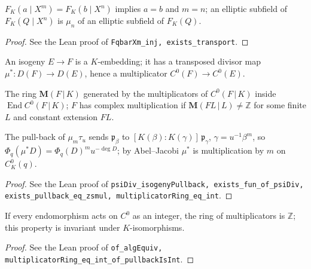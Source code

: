 \begin{lemma}
\label{lem:XVIII-unique}
\leanok
$F_K(a\mid X^m)=F_K(b\mid X^n)$ implies $a=b$ and $m=n$; an elliptic subfield of $F_K(Q\mid X^n)$ is $\mu_n$ of an elliptic subfield of $F_K(Q)$.
\end{lemma}
\begin{proof}
\leanok
See the Lean proof of \texttt{FqbarXm\_inj, exists\_transport}.
\end{proof}

\begin{definition}[Isogeny]
\label{def:isogeny}
\leanok
An isogeny $E\to F$ is a $K$-embedding; it has a transposed divisor map $\mu^*:D(F)\to D(E)$, hence a multiplicator $C^0(F)\to C^0(E)$.
\end{definition}

\begin{definition}
\label{def:complex-multiplication}
\leanok
The ring $\mathbf M(F\,|\,K)$ generated by the multiplicators of $C^0(F\,|\,K)$ inside $\operatorname{End}C^0(F\,|\,K)$; $F$ has complex multiplication if $\mathbf M(FL\,|\,L)\ne\mathbb Z$ for some finite $L$ and constant extension $FL$.
\end{definition}

\begin{lemma}[Multiplicators of $F_K(q)$]
\label{lem:XVIIIb-mult}
\leanok
The pull-back of $\mu_m\tau_u$ sends $\mathfrak p_\beta$ to $[K(\beta):K(\gamma)]\,\mathfrak p_\gamma$, $\gamma=u^{-1}\beta^m$, so $\Phi_q(\mu^*D)=\Phi_q(D)^m u^{-\deg D}$; by Abel--Jacobi $\mu^*$ is multiplication by $m$ on $C^0_K(q)$.
\end{lemma}
\begin{proof}
\leanok
See the Lean proof of \texttt{psiDiv\_isogenyPullback, exists\_fun\_of\_psiDiv, exists\_pullback\_eq\_zsmul, multiplicatorRing\_eq\_int}.
\end{proof}

\begin{lemma}
\label{lem:mult-transfer}
\leanok
If every endomorphism acts on $C^0$ as an integer, the ring of multiplicators is $\mathbb Z$; this property is invariant under $K$-isomorphisms.
\end{lemma}
\begin{proof}
\leanok
See the Lean proof of \texttt{of\_algEquiv, multiplicatorRing\_eq\_int\_of\_pullbackIsInt}.
\end{proof}

